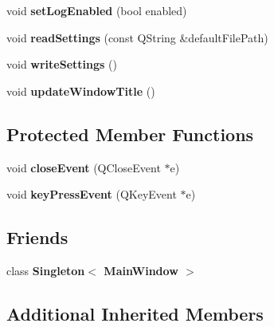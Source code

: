\begin{DoxyCompactItemize}
\item 
\hypertarget{class_main_window_aa547a4f6c7ad735d6ca9f8feb763a5ea}{void {\bfseries set\-Log\-Enabled} (bool enabled)}\label{class_main_window_aa547a4f6c7ad735d6ca9f8feb763a5ea}

\item 
\hypertarget{class_main_window_a73bcdd6b0d09e9688f6545ee2fcecfe2}{void {\bfseries read\-Settings} (const Q\-String \&default\-File\-Path)}\label{class_main_window_a73bcdd6b0d09e9688f6545ee2fcecfe2}

\item 
\hypertarget{class_main_window_a49be45fc9b993fdc3afe55d4b6fa0650}{void {\bfseries write\-Settings} ()}\label{class_main_window_a49be45fc9b993fdc3afe55d4b6fa0650}

\item 
\hypertarget{class_main_window_a90cfbcf2e0f2549760a60f184ee0acbf}{void {\bfseries update\-Window\-Title} ()}\label{class_main_window_a90cfbcf2e0f2549760a60f184ee0acbf}

\end{DoxyCompactItemize}
\subsection*{Protected Member Functions}
\begin{DoxyCompactItemize}
\item 
\hypertarget{class_main_window_a8a5bf36f9544ed3ec3a9eea9b7154564}{void {\bfseries close\-Event} (Q\-Close\-Event $\ast$e)}\label{class_main_window_a8a5bf36f9544ed3ec3a9eea9b7154564}

\item 
\hypertarget{class_main_window_adf88315e557e377353059bd313b1bfa6}{void {\bfseries key\-Press\-Event} (Q\-Key\-Event $\ast$e)}\label{class_main_window_adf88315e557e377353059bd313b1bfa6}

\end{DoxyCompactItemize}
\subsection*{Friends}
\begin{DoxyCompactItemize}
\item 
\hypertarget{class_main_window_a00753ab14e741196f687a6abf20ef83c}{class {\bfseries Singleton$<$ Main\-Window $>$}}\label{class_main_window_a00753ab14e741196f687a6abf20ef83c}

\end{DoxyCompactItemize}
\subsection*{Additional Inherited Members}


